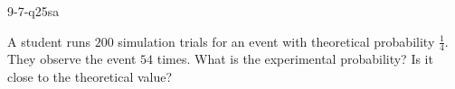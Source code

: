 \begin{practiceQuestion}{9-7-q25}{sa}
\begin{questionText}
A student runs $200$ simulation trials for an event with theoretical probability $\frac{1}{4}$. They observe the event $54$ times. What is the experimental probability? Is it close to the theoretical value?
\end{questionText}
\end{practiceQuestion}
